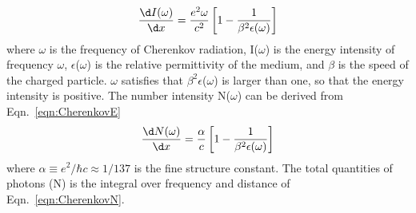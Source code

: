 \begin{align}
\frac{\d I(\omega)}{\d x} = \frac{e^2 \omega}{c^2} \left[ 1-\frac{1}{\beta^2 \epsilon(\omega)} \right] 
\label{eqn:CherenkovE}
\end{align}
where $\omega$ is the frequency of Cherenkov radiation, I($\omega$) is the energy intensity of frequency $\omega$, $\epsilon$($\omega$) is the relative permittivity of the medium, and $\beta$ is the speed of the charged particle. 
$\omega$ satisfies that $\beta^2 \epsilon$($\omega$) is larger than one, so that the energy intensity is positive.
The number intensity N($\omega$) can be derived from Eqn.~\ref{eqn:CherenkovE}
\begin{align}
\frac{\d N(\omega)}{\d x} = \frac{\alpha}{c} \left[1-\frac{1}{\beta^2 \epsilon(\omega)} \right] 
\label{eqn:CherenkovN}
\end{align}
where $\alpha \equiv e^2/\hbar c \approx 1/137$ is the fine structure constant. The total quantities of photons (N) is the integral over frequency and distance of Eqn.~\ref{eqn:CherenkovN}.



